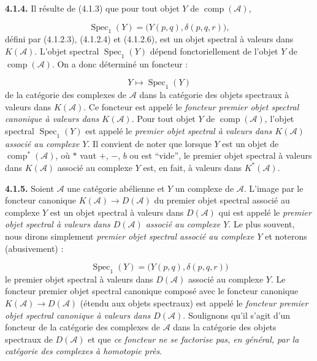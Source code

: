\clearpage
{}%
\begingroup\small\setlength{\parskip}{0pt}\setlength{\emergencystretch}{1.5em}
\setlength{\abovedisplayskip}{4pt plus 2pt minus 2pt}%
\setlength{\belowdisplayskip}{4pt plus 2pt minus 2pt}%

\medskip\noindent\textbf{4.1.4.}\quad
Il résulte de (4.1.3) que pour tout objet $Y$ de
$\operatorname{comp}(\mathcal A)$,

\[
\operatorname{Spec}_1(Y)=\bigl(Y(p,q),\delta(p,q,r)\bigr),
\]
défini par (4.1.2.3), (4.1.2.4) et (4.1.2.6), est un objet spectral à
valeurs dans $K(\mathcal A)$. L'objet spectral $\operatorname{Spec}_1(Y)$
dépend fonctoriellement de l'objet $Y$ de
$\operatorname{comp}(\mathcal A)$. On a donc déterminé un foncteur :

\[
Y\longmapsto\operatorname{Spec}_1(Y)
\]
de la catégorie des complexes de $\mathcal A$ dans la catégorie des objets
spectraux à valeurs dans $K(\mathcal A)$. Ce foncteur est appelé le
\emph{foncteur premier objet spectral canonique à valeurs dans
$K(\mathcal A)$}. Pour tout objet $Y$ de
$\operatorname{comp}(\mathcal A)$, l'objet spectral
$\operatorname{Spec}_1(Y)$ est appelé le \emph{premier objet spectral à
valeurs dans $K(\mathcal A)$ associé au complexe $Y$}. Il convient de noter
que lorsque $Y$ est un objet de $\operatorname{comp}^{*}(\mathcal A)$, où
$*$ vaut $+$, $-$, $b$ ou est ``vide'', le premier objet spectral à valeurs
dans $K(\mathcal A)$ associé au complexe $Y$ est, en fait, à valeurs dans
$K^{*}(\mathcal A)$.

\medskip\noindent\textbf{4.1.5.}\quad
Soient $\mathcal A$ une catégorie abélienne et $Y$ un complexe de
$\mathcal A$. L'image par le foncteur canonique
$K(\mathcal A)\longrightarrow D(\mathcal A)$ du premier objet spectral
associé au complexe $Y$ est un objet spectral à valeurs dans
$D(\mathcal A)$ qui est appelé le \emph{premier objet spectral à valeurs
dans $D(\mathcal A)$ associé au complexe $Y$}. Le plus souvent, nous dirons
simplement \emph{premier objet spectral associé au complexe $Y$} et
noterons (abusivement) :

\[
\operatorname{Spec}_1(Y)=\bigl(Y(p,q),\delta(p,q,r)\bigr)
\]
le premier objet spectral à valeurs dans $D(\mathcal A)$ associé au
complexe $Y$. Le foncteur premier objet spectral canonique composé avec le
foncteur canonique $K(\mathcal A)\longrightarrow D(\mathcal A)$ (étendu aux
objets spectraux) est appelé le \emph{foncteur premier objet spectral
canonique à valeurs dans $D(\mathcal A)$}. Soulignons qu'il s'agit d'un
foncteur de la catégorie des complexes de $\mathcal A$ dans la catégorie
des objets spectraux de $D(\mathcal A)$ et que \emph{ce foncteur ne se
factorise pas, en général, par la catégorie des complexes à homotopie près}.


